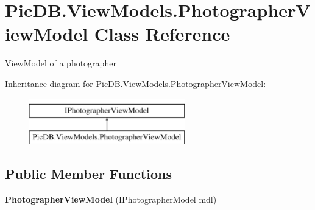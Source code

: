 \hypertarget{class_pic_d_b_1_1_view_models_1_1_photographer_view_model}{}\section{Pic\+D\+B.\+View\+Models.\+Photographer\+View\+Model Class Reference}
\label{class_pic_d_b_1_1_view_models_1_1_photographer_view_model}


View\+Model of a photographer  


Inheritance diagram for Pic\+D\+B.\+View\+Models.\+Photographer\+View\+Model\+:\begin{figure}[H]
\begin{center}
\leavevmode
\includegraphics[height=2.000000cm]{class_pic_d_b_1_1_view_models_1_1_photographer_view_model}
\end{center}
\end{figure}
\subsection*{Public Member Functions}
\begin{DoxyCompactItemize}
\item 
\mbox{\label{class_pic_d_b_1_1_view_models_1_1_photographer_view_model_a2e8f8ea38287792462876fce9af896e2}} 
{\bfseries Photographer\+View\+Model} (I\+Photographer\+Model mdl)
\end{DoxyCompactItemize}
